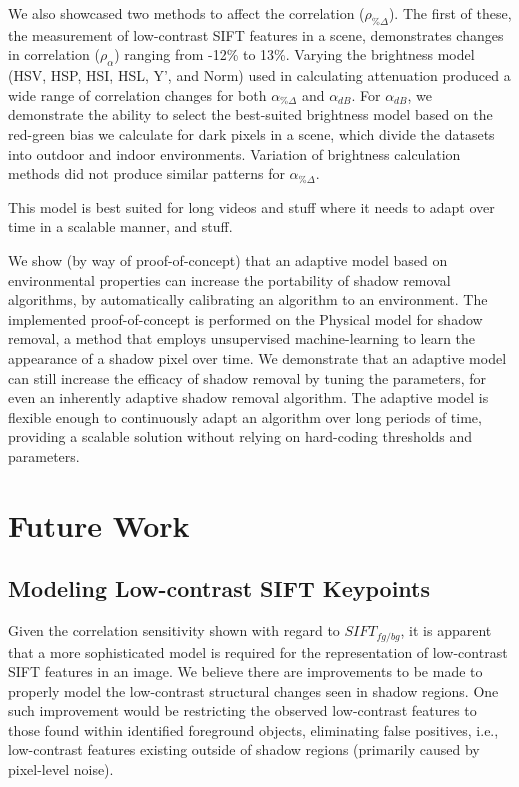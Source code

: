 We also showcased two methods to affect the correlation ($\rho_{\%\Delta}$). The first of these, the measurement of low-contrast SIFT features in a scene, demonstrates changes in correlation ($\rho_{\alpha}$) ranging from -12\% to 13\%. Varying the brightness model (HSV, HSP, HSI, HSL, Y', and Norm) used in calculating attenuation produced a wide range of correlation changes for both $\alpha_{\%\Delta}$ and $\alpha_{dB}$. For $\alpha_{dB}$, we demonstrate the ability to select the best-suited brightness model based on the red-green bias we calculate for dark pixels in a scene, which divide the datasets into outdoor and indoor environments. Variation of brightness calculation methods did not produce similar patterns for $\alpha_{\%\Delta}$.

This model is best suited for long videos and stuff where it needs to adapt over time in a scalable manner, and stuff.

We show (by way of proof-of-concept) that an adaptive model based on environmental properties can increase the portability of shadow removal algorithms, by automatically calibrating an algorithm to an environment. The implemented proof-of-concept is performed on the Physical model for shadow removal, a method that employs unsupervised machine-learning to learn the appearance of a shadow pixel over time. We demonstrate that an adaptive model can still increase the efficacy of shadow removal by tuning the parameters, for even an inherently adaptive shadow removal algorithm. The adaptive model is flexible enough to continuously adapt an algorithm over long periods of time, providing a scalable solution without relying on hard-coding thresholds and parameters. 

\section{Future Work}

\subsection{Modeling Low-contrast SIFT Keypoints}

Given the correlation sensitivity shown with regard to $SIFT_{fg/bg}$, it is apparent that a more sophisticated model is required for the representation of low-contrast SIFT features in an image. We believe there are improvements to be made to properly model the low-contrast structural changes seen in shadow regions. One such improvement would be restricting the observed low-contrast features to those found within identified foreground objects, eliminating false positives, i.e., low-contrast features existing outside of shadow regions (primarily caused by pixel-level noise).

